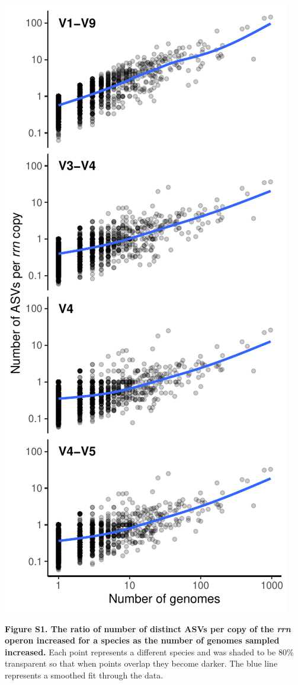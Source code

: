 \documentclass[
]{article}
\begin{document}
\includegraphics{../figures/esv_rate.pdf}

\textbf{Figure S1. The ratio of number of distinct ASVs per copy of the
\emph{rrn} operon increased for a species as the number of genomes
sampled increased.} Each point represents a different species and was
shaded to be 80\% transparent so that when points overlap they become
darker. The blue line represents a smoothed fit through the data.
\end{document}
